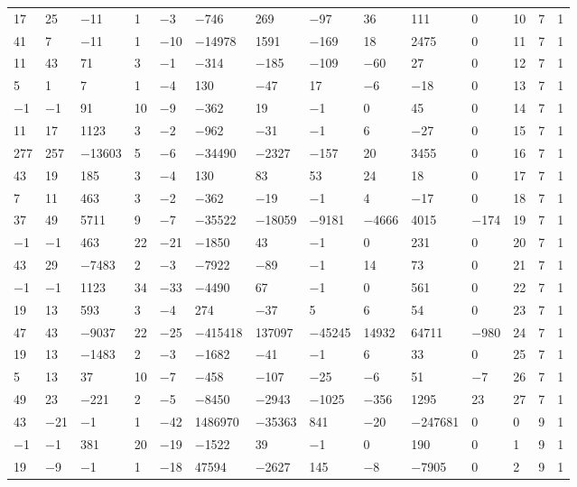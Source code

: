 \documentclass[10pt,a4paper]{amsart}
\numberwithin{equation}{section}
\theoremstyle{definition}
\numberwithin{table}{section}
\begin{document}
{\begin{paracol}{3}
\begin{supertabular}{|w{c}{.32cm}w{c}{.32cm}w{c}{.32cm}@{\hspace{.5cm}}w{c}{.2cm}w{c}{.2cm}|@{\hspace{\tabcolsep}}HHHHHHw{c}{.17cm}w{c}{.17cm}w{c}{.17cm}|}
			17 & 25 & $-$11 & 1 & $-$3 & $-$746 & 269 & $-$97 & 36 & 111 & 0 & 10 & 7 & 1 \\
			41 & 7 & $-$11 & 1 & $-$10 & $-$14978 & 1591 & $-$169 & 18 & 2475 & 0 & 11 & 7 & 1 \\
			11 & 43 & 71 & 3 & $-$1 & $-$314 & $-$185 & $-$109 & $-$60 & 27 & 0 & 12 & 7 & 1 \\
			5 & 1 & 7 & 1 & $-$4 & 130 & $-$47 & 17 & $-$6 & $-$18 & 0 & 13 & 7 & 1 \\
			$-$1 & $-$1 & 91 & 10 & $-$9 & $-$362 & 19 & $-$1 & 0 & 45 & 0 & 14 & 7 & 1 \\
			11 & 17 & 1123 & 3 & $-$2 & $-$962 & $-$31 & $-$1 & 6 & $-$27 & 0 & 15 & 7 & 1 \\
			277 & 257 & $-$13603 & 5 & $-$6 & $-$34490 & $-$2327 & $-$157 & 20 & 3455 & 0 & 16 & 7 & 1 \\
			43 & 19 & 185 & 3 & $-$4 & 130 & 83 & 53 & 24 & 18 & 0 & 17 & 7 & 1 \\
			7 & 11 & 463 & 3 & $-$2 & $-$362 & $-$19 & $-$1 & 4 & $-$17 & 0 & 18 & 7 & 1 \\
			37 & 49 & 5711 & 9 & $-$7 & $-$35522 & $-$18059 & $-$9181 & $-$4666 & 4015 & $-$174 & 19 & 7 & 1 \\
			$-$1 & $-$1 & 463 & 22 & $-$21 & $-$1850 & 43 & $-$1 & 0 & 231 & 0 & 20 & 7 & 1 \\
			43 & 29 & $-$7483 & 2 & $-$3 & $-$7922 & $-$89 & $-$1 & 14 & 73 & 0 & 21 & 7 & 1 \\
			$-$1 & $-$1 & 1123 & 34 & $-$33 & $-$4490 & 67 & $-$1 & 0 & 561 & 0 & 22 & 7 & 1 \\
			19 & 13 & 593 & 3 & $-$4 & 274 & $-$37 & 5 & 6 & 54 & 0 & 23 & 7 & 1 \\
			47 & 43 & $-$9037 & 22 & $-$25 & $-$415418 & 137097 & $-$45245 & 14932 & 64711 & $-$980 & 24 & 7 & 1 \\
			19 & 13 & $-$1483 & 2 & $-$3 & $-$1682 & $-$41 & $-$1 & 6 & 33 & 0 & 25 & 7 & 1 \\
			5 & 13 & 37 & 10 & $-$7 & $-$458 & $-$107 & $-$25 & $-$6 & 51 & $-$7 & 26 & 7 & 1 \\
			49 & 23 & $-$221 & 2 & $-$5 & $-$8450 & $-$2943 & $-$1025 & $-$356 & 1295 & 23 & 27 & 7 & 1 \\
			43 & $-$21 & $-$1 & 1 & $-$42 & 1486970 & $-$35363 & 841 & $-$20 & $-$247681 & 0 & 0 & 9 & 1 \\
			$-$1 & $-$1 & 381 & 20 & $-$19 & $-$1522 & 39 & $-$1 & 0 & 190 & 0 & 1 & 9 & 1 \\
			19 & $-$9 & $-$1 & 1 & $-$18 & 47594 & $-$2627 & 145 & $-$8 & $-$7905 & 0 & 2 & 9 & 1 \\

\end{supertabular}
\end{paracol}}
\end{document}
